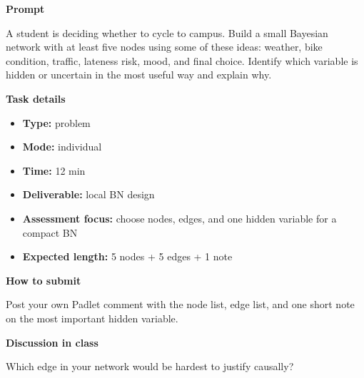 \documentclass[11pt]{article}
\begin{document}
\begin{tcolorbox}[colback=white,colframe=MidnightBlue,title={Q3 Structured Problem},fonttitle=\bfseries,breakable]
\begin{center}
\end{center}

{\large\bfseries\color{MidnightBlue} Prompt}\par\medskip
A student is deciding whether to cycle to campus. Build a small Bayesian network with at least five nodes using some of these ideas: weather, bike condition, traffic, lateness risk, mood, and final choice. Identify which variable is hidden or uncertain in the most useful way and explain why.

{\large\bfseries\color{MidnightBlue} Task details}\par\medskip
\begin{itemize}\item \textbf{Type:} problem
\item \textbf{Mode:} individual
\item \textbf{Time:} 12 min
\item \textbf{Deliverable:} local BN design
\item \textbf{Assessment focus:} choose nodes, edges, and one hidden variable for a compact BN
\item \textbf{Expected length:} 5 nodes + 5 edges + 1 note\end{itemize}

{\large\bfseries\color{MidnightBlue} How to submit}\par\medskip
Post your own Padlet comment with the node list, edge list, and one short note on the most important hidden variable.

{\large\bfseries\color{MidnightBlue} Discussion in class}\par\medskip
Which edge in your network would be hardest to justify causally?


\end{tcolorbox}
\end{document}
